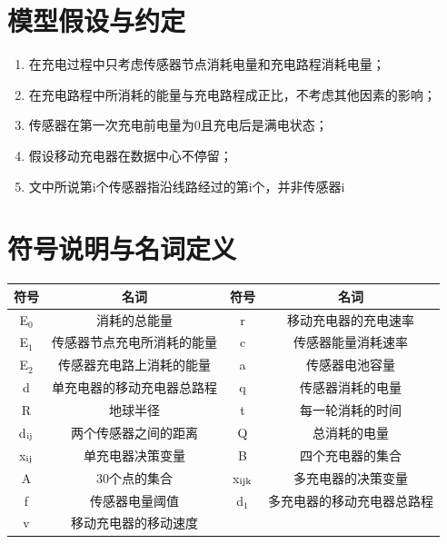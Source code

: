 \documentclass{article}
\begin{document}
\newpage                                                    %
\section{模型假设与约定}
\begin{enumerate}
\item 在充电过程中只考虑传感器节点消耗电量和充电路程消耗电量；
\item 在充电路程中所消耗的能量与充电路程成正比，不考虑其他因素的影响；
\item 传感器在第一次充电前电量为0且充电后是满电状态；
\item 假设移动充电器在数据中心不停留；
\item 文中所说第i个传感器指沿线路经过的第i个，并非传感器i
\end{enumerate}
\vspace{4em}
\section{符号说明与名词定义}
\vspace{4ex}                %
\begin{center}              %
    \begin{tabular}{cccc}
        \toprule
        符号    & 名词  & 符号  & 名词\\
        \midrule
        E$_0$  & 消耗的总能量        & r    & 移动充电器的充电速率    \\

        E$_1$  & 传感器节点充电所消耗的能量 & c    & 传感器能量消耗速率     \\

        E$_2$  & 传感器充电路上消耗的能量  & a    & 传感器电池容量       \\

        d   & 单充电器的移动充电器总路程 & q    & 传感器消耗的电量      \\

        R   & 地球半径          & t    & 每一轮消耗的时间      \\

        d$\rm _{ij}$ & 两个传感器之间的距离    & Q    & 总消耗的电量        \\

        x$\rm _{ij}$ & 单充电器决策变量      & B    & 四个充电器的集合      \\

        A   & 30个点的集合       & x$\rm _{ijk}$ & 多充电器的决策变量     \\

        f   & 传感器电量阈值       & d$_1$   & 多充电器的移动充电器总路程 \\

        v   & 移动充电器的移动速度    &      &   \\
        \bottomrule
    \end{tabular}
\end{center}
\end{document}
